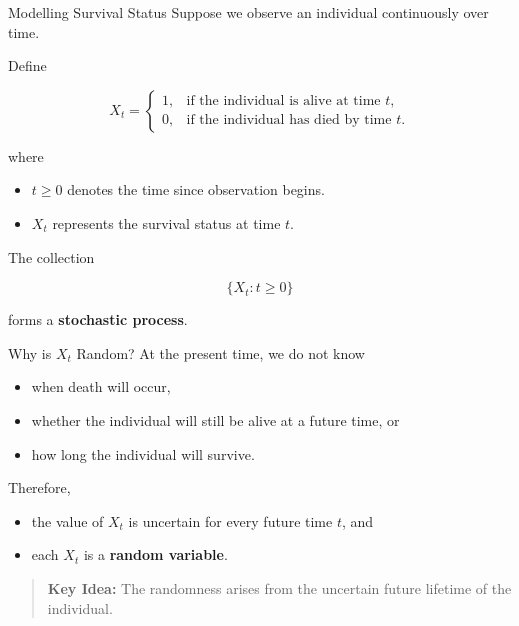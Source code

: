 \documentclass[
  ignorenonframetext,
  aspectratio=169,
]{beamer}
\providecommand{\tightlist}{%
  \setlength{\itemsep}{0pt}\setlength{\parskip}{0pt}}
\begin{document}
\begin{frame}{Modelling Survival Status}
\protect{}\label{modelling-survival-status}
Suppose we observe an individual continuously over time.

Define

\[
X_t=
\begin{cases}
1, & \text{if the individual is alive at time }t,\\
0, & \text{if the individual has died by time }t.
\end{cases}
\]

where

\begin{itemize}
\tightlist
\item
  \(t\ge0\) denotes the time since observation begins.
\item
  \(X_t\) represents the survival status at time \(t\).
\end{itemize}

The collection

\[
\{X_t:t\ge0\}
\]

forms a \textbf{stochastic process}.
\end{frame}

\begin{frame}{Why is \(X_t\) Random?}
\protect{}\label{why-is-x_t-random}
At the present time, we do not know

\begin{itemize}
\tightlist
\item
  when death will occur,
\item
  whether the individual will still be alive at a future time, or
\item
  how long the individual will survive.
\end{itemize}

Therefore,

\begin{itemize}
\tightlist
\item
  the value of \(X_t\) is uncertain for every future time \(t\), and
\item
  each \(X_t\) is a \textbf{random variable}.
\end{itemize}

\begin{quote}
\textbf{Key Idea:} The randomness arises from the uncertain future
lifetime of the individual.
\end{quote}
\end{frame}
\end{document}
